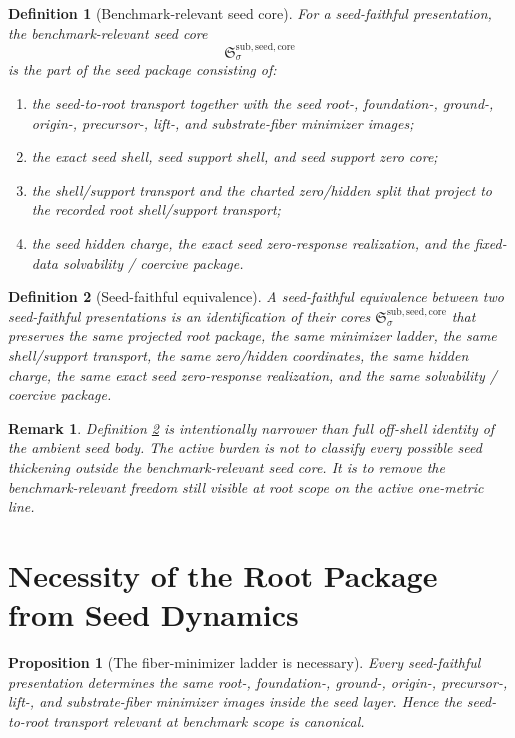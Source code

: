 \documentclass[11pt]{article}
\newcommand{\SeedCore}{\mathfrak S^{\mathrm{sub,seed,core}}}
\newtheorem{definition}{Definition}
\newtheorem{proposition}{Proposition}
\newtheorem{remark}{Remark}
\begin{document}
\begin{definition}[Benchmark-relevant seed core]
\label{def:core}
For a seed-faithful presentation, the \emph{benchmark-relevant seed core}
\[
\SeedCore_{\sigma}
\]
is the part of the seed package consisting of:
\begin{enumerate}
    \item the seed-to-root transport together with the seed root-, foundation-, ground-, origin-, precursor-, lift-, and substrate-fiber minimizer images;
    \item the exact seed shell, seed support shell, and seed support zero core;
    \item the shell/support transport and the charted zero/hidden split that project to the recorded root shell/support transport;
    \item the seed hidden charge, the exact seed zero-response realization, and the fixed-data solvability / coercive package.
\end{enumerate}
\end{definition}

\begin{definition}[Seed-faithful equivalence]
\label{def:equiv}
A \emph{seed-faithful equivalence} between two seed-faithful presentations is an identification of their cores \(\SeedCore_{\sigma}\) that preserves the same projected root package, the same minimizer ladder, the same shell/support transport, the same zero/hidden coordinates, the same hidden charge, the same exact seed zero-response realization, and the same solvability / coercive package.
\end{definition}

\begin{remark}
Definition \ref{def:equiv} is intentionally narrower than full off-shell identity of the ambient seed body. The active burden is not to classify every possible seed thickening outside the benchmark-relevant seed core. It is to remove the benchmark-relevant freedom still visible at root scope on the active one-metric line.
\end{remark}

\section{Necessity of the Root Package from Seed Dynamics}

\begin{proposition}[The fiber-minimizer ladder is necessary]
\label{prop:minimizers}
Every seed-faithful presentation determines the same root-, foundation-, ground-, origin-, precursor-, lift-, and substrate-fiber minimizer images inside the seed layer. Hence the seed-to-root transport relevant at benchmark scope is canonical.
\end{proposition}
\end{document}
